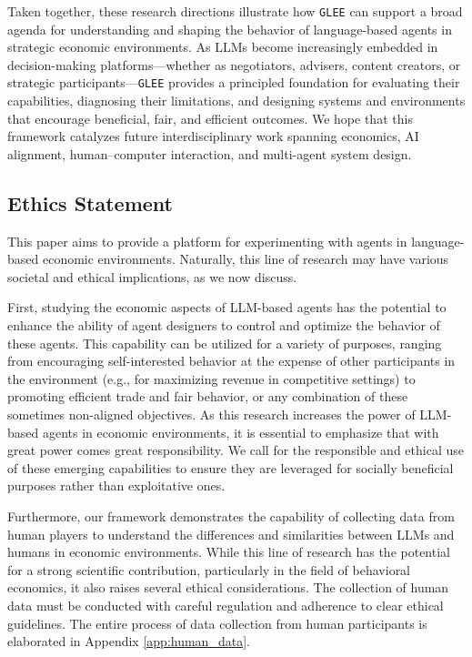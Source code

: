 \medskip
Taken together, these research directions illustrate how \texttt{GLEE} can support a broad agenda for 
understanding and shaping the behavior of language-based agents in strategic economic environments. As LLMs 
become increasingly embedded in decision-making platforms---whether as negotiators, advisers, content creators, 
or strategic participants---\texttt{GLEE} provides a principled foundation for evaluating their capabilities, 
diagnosing their limitations, and designing systems and environments that encourage beneficial, fair, and 
efficient outcomes. We hope that this framework catalyzes future interdisciplinary work spanning economics, AI 
alignment, human--computer interaction, and multi-agent system design.



\subsection{Ethics Statement} \label{app:ethics_statement}
This paper aims to provide a platform for experimenting with agents in language-based economic environments. Naturally, this line of research may have various societal and ethical implications, as we now discuss.

First, studying the economic aspects of LLM-based agents has the potential to enhance the ability of agent designers to control and optimize the behavior of these agents. This capability can be utilized for a variety of purposes, ranging from encouraging self-interested behavior at the expense of other participants in the environment (e.g., for maximizing revenue in competitive settings) to promoting efficient trade and fair behavior, or any combination of these sometimes non-aligned objectives. As this research increases the power of LLM-based agents in economic environments, it is essential to emphasize that with great power comes great responsibility. We call for the responsible and ethical use of these emerging capabilities to ensure they are leveraged for socially beneficial purposes rather than exploitative ones.

Furthermore, our framework demonstrates the capability of collecting data from human players to understand the differences and similarities between LLMs and humans in economic environments. While this line of research has the potential for a strong scientific contribution, particularly in the field of behavioral economics, it also raises several ethical considerations. The collection of human data must be conducted with careful regulation and adherence to clear ethical guidelines. The entire process of data collection from human participants is elaborated in Appendix \ref{app:human_data}.

